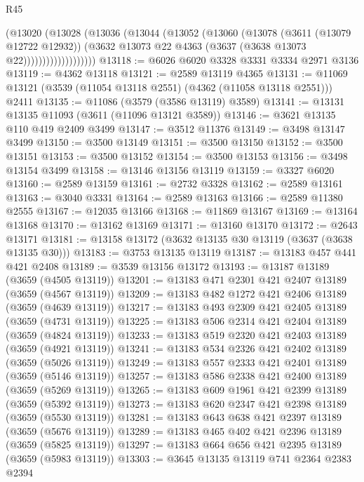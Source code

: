 \begin{lexlean}{R45}
\begin{coremodule}
                      (@13020
                        (@13028
                          (@13036
                            (@13044
                              (@13052
                                (@13060
                                  (@13078
                                    (@3611 (@13079 @12722 @12932))
                                    (@3632
                                      @13073
                                      @22
                                      @4363
                                      (@3637 (@3638 @13073 @22)))))))))))))))))))
@13118 := @6026 @6020 @3328 @3331 @3334 @2971 @3136
@13119 := @4362 @13118
@13121 := @2589 @13119 @4365
@13131 := @11069 @13121 (@3539 (@11054 @13118 @2551) (@4362 (@11058 @13118 @2551))) @2411
@13135 := @11086 (@3579 (@3586 @13119) @3589)
@13141 := @13131 @13135 @11093 (@3611 (@11096 @13121 @3589))
@13146 := @3621 @13135 @110 @419 @2409 @3499
@13147 := @3512 @11376
@13149 := @3498 @13147 @3499
@13150 := @3500 @13149
@13151 := @3500 @13150
@13152 := @3500 @13151
@13153 := @3500 @13152
@13154 := @3500 @13153
@13156 := @3498 @13154 @3499
@13158 := @13146 @13156 @13119
@13159 := @3327 @6020
@13160 := @2589 @13159
@13161 := @2732 @3328
@13162 := @2589 @13161
@13163 := @3040 @3331
@13164 := @2589 @13163
@13166 := @2589 @11380 @2555
@13167 := @12035 @13166
@13168 := @11869 @13167
@13169 := @13164 @13168
@13170 := @13162 @13169
@13171 := @13160 @13170
@13172 := @2643 @13171
@13181 := @13158 @13172 (@3632 @13135 @30 @13119 (@3637 (@3638 @13135 @30)))
@13183 := @3753 @13135 @13119
@13187 := @13183 @457 @441 @421 @2408
@13189 := @3539 @13156 @13172
@13193 := @13187 @13189 (@3659 (@4505 @13119))
@13201 := @13183 @471 @2301 @421 @2407 @13189 (@3659 (@4567 @13119))
@13209 := @13183 @482 @1272 @421 @2406 @13189 (@3659 (@4639 @13119))
@13217 := @13183 @493 @2309 @421 @2405 @13189 (@3659 (@4731 @13119))
@13225 := @13183 @506 @2314 @421 @2404 @13189 (@3659 (@4824 @13119))
@13233 := @13183 @519 @2320 @421 @2403 @13189 (@3659 (@4921 @13119))
@13241 := @13183 @534 @2326 @421 @2402 @13189 (@3659 (@5026 @13119))
@13249 := @13183 @557 @2333 @421 @2401 @13189 (@3659 (@5146 @13119))
@13257 := @13183 @586 @2338 @421 @2400 @13189 (@3659 (@5269 @13119))
@13265 := @13183 @609 @1961 @421 @2399 @13189 (@3659 (@5392 @13119))
@13273 := @13183 @620 @2347 @421 @2398 @13189 (@3659 (@5530 @13119))
@13281 := @13183 @643 @638 @421 @2397 @13189 (@3659 (@5676 @13119))
@13289 := @13183 @465 @402 @421 @2396 @13189 (@3659 (@5825 @13119))
@13297 := @13183 @664 @656 @421 @2395 @13189 (@3659 (@5983 @13119))
@13303 := @3645 @13135 @13119 @741 @2364 @2383 @2394

\end{coremodule}
\end{lexlean}
